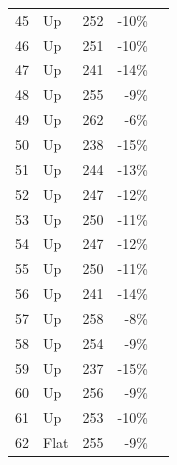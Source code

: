 \documentclass{scrartcl}
\begin{document}
\begin{longtable}{|r|l|r|r|r|}
    45    & Up    & 252   & \cellcolor[rgb]{ 1,  .922,  .612}\textcolor[rgb]{ .612,  .341,  0}{-10\%} &  \\
    46    & Up    & 251   & \cellcolor[rgb]{ 1,  .922,  .612}\textcolor[rgb]{ .612,  .341,  0}{-10\%} &  \\
    47    & Up    & 241   & \cellcolor[rgb]{ 1,  .78,  .808}\textcolor[rgb]{ .612,  0,  .024}{-14\%} &  \\
    48    & Up    & 255   & \cellcolor[rgb]{ 1,  .922,  .612}\textcolor[rgb]{ .612,  .341,  0}{-9\%} &  \\
    49    & Up    & 262   & \cellcolor[rgb]{ 1,  .922,  .612}\textcolor[rgb]{ .612,  .341,  0}{-6\%} &  \\
    50    & Up    & 238   & \cellcolor[rgb]{ 1,  .78,  .808}\textcolor[rgb]{ .612,  0,  .024}{-15\%} &  \\
    51    & Up    & 244   & \cellcolor[rgb]{ 1,  .78,  .808}\textcolor[rgb]{ .612,  0,  .024}{-13\%} &  \\
    52    & Up    & 247   & \cellcolor[rgb]{ 1,  .78,  .808}\textcolor[rgb]{ .612,  0,  .024}{-12\%} &  \\
    53    & Up    & 250   & \cellcolor[rgb]{ 1,  .78,  .808}\textcolor[rgb]{ .612,  0,  .024}{-11\%} &  \\
    54    & Up    & 247   & \cellcolor[rgb]{ 1,  .78,  .808}\textcolor[rgb]{ .612,  0,  .024}{-12\%} &  \\
    55    & Up    & 250   & \cellcolor[rgb]{ 1,  .78,  .808}\textcolor[rgb]{ .612,  0,  .024}{-11\%} &  \\
    56    & Up    & 241   & \cellcolor[rgb]{ 1,  .78,  .808}\textcolor[rgb]{ .612,  0,  .024}{-14\%} &  \\
    57    & Up    & 258   & \cellcolor[rgb]{ 1,  .922,  .612}\textcolor[rgb]{ .612,  .341,  0}{-8\%} &  \\
    58    & Up    & 254   & \cellcolor[rgb]{ 1,  .922,  .612}\textcolor[rgb]{ .612,  .341,  0}{-9\%} &  \\
    59    & Up    & 237   & \cellcolor[rgb]{ 1,  .78,  .808}\textcolor[rgb]{ .612,  0,  .024}{-15\%} &  \\
    60    & Up    & 256   & \cellcolor[rgb]{ 1,  .922,  .612}\textcolor[rgb]{ .612,  .341,  0}{-9\%} &  \\
    61    & Up    & 253   & \cellcolor[rgb]{ 1,  .922,  .612}\textcolor[rgb]{ .612,  .341,  0}{-10\%} &  \\
    62    & Flat  & 255   & \cellcolor[rgb]{ 1,  .922,  .612}\textcolor[rgb]{ .612,  .341,  0}{-9\%} &  \\

\end{longtable}
\end{document}
